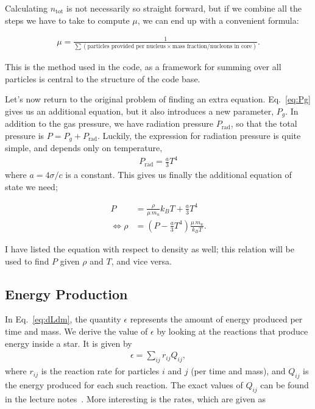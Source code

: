 \documentclass[11pt,twocolumn]{article}
\begin{document}
Calculating $n_\text{tot}$ is not necessarily so straight forward, but
if we combine all the steps we have to take to compute $\mu$, we can
end up with a convenient formula:

\begin{align}
  \mu = \frac{1}{\sum (\text{particles provided per
  nucleus}\times\text{mass fraction}/\text{nucleons in core})}\label{eq:mu_0}.
\end{align}

This is the method used in the code, as a framework for summing over
all particles is central to the structure of the code base.


Let's now return to the original problem of finding an extra
equation. Eq.~\eqref{eq:Pg} gives us an additional equation, but it
also introduces a new parameter, $P_g$. In addition to the gas
pressure, we have radiation pressure $P_{\text{rad}}$, so that the
total pressure is $P = P_g + P_\text{rad}$. Luckily, the expression
for radiation pressure is quite simple, and depends only on
temperature,
\begin{align}
  P_\text{rad} = \frac{ a }{ 3 }T^4
\end{align}
where $a = 4\sigma/c$ is a constant. This gives us finally the
additional equation of state we need;

\begin{align}
  P &= \frac{ \rho }{ \mu\,m_u }k_B T + \frac{ a }{ 3 }T^4\label{eq:P-eq_state}\\
  \Leftrightarrow \rho &= (P - \frac{a}{3}T^4) \frac{ \mu\,m_u }{ k_BT }\label{eq:rho-eq_state}.
\end{align}

I have listed the equation with respect to density as well; this
relation will be used to find $P$ given $\rho$ and $T$, and vice
versa.


\subsection{Energy Production}
In Eq.~\eqref{eq:dLdm}, the quantity $\epsilon$ represents the amount
of energy produced per time and mass. We derive the value of
$\epsilon$ by looking at the reactions that produce energy inside a
star. It is given by
\begin{align}
  \epsilon = \sum_{ij}r_{ij}Q_{ij},
\end{align}
where $r_{ij}$ is the reaction rate for particles $i$ and $j$ (per
time and mass), and $Q_{ij}$ is the energy produced for each such
reaction. The exact values of $Q_{ij}$ can be found in the lecture
notes~\cite{lecture-notes}. More interesting is the rates, which are
given as
\end{document}
